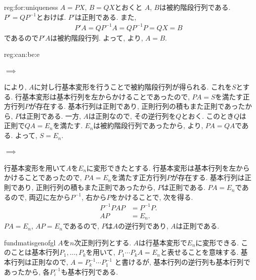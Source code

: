 \begin{proofof}{reg:for:uniqueness}
  $A=PX$, $B=QX$とおくと
  $A$, $B$は被約階段行列である.
  $P'=QP^{-1}$とおけば.
  $P'$は正則である.
  また,
  \begin{align*}
    P'A=QP^{-1}A=QP^{-1}P=QX=B
  \end{align*}
  であるので$P'A$は被約階段行列.
  よって,
  より,
  $A=B$.
\end{proofof}
\begin{proofof}{reg:can:be:e}
\paragraph{$\implies$}
により,
$A$に対し行基本変形を行うことで被約階段行列が得られる.
これを$S$とする.
行基本変形は基本行列を左からかけることであったので,
$PA=S$を満たす正方行列$P$が存在する.
基本行列は正則であり, 正則行列の積もまた正則であったから,
$P$は正則である.
一方,
$A$は正則なので,
その逆行列を$Q$とおく.
このとき$Q$は正則で$QA=E_n$を満たす.
$E_n$は被約階段行列であったから,
より,
$PA=QA$である.
よって,
$S=E_n$.

\paragraph{$\implies$}
行基本変形を用いて$A$を$E_n$に変形できたとする.
行基本変形は基本行列を左からかけることであったので,
$PA=E_n$を満たす正方行列$P$が存在する.
基本行列は正則であり, 正則行列の積もまた正則であったから,
$P$は正則である.
$PA=E_n$であるので,
両辺に左から$P^{-1}$, 右から$P$をかけることで,
次を得る.
\begin{align*}
  P^{-1}PAP&=P^{-1}P.\\
  AP&=E_n.
\end{align*}
$PA=E_n$, $AP=E_n$であるので,
$P$は$A$の逆行列であり,
$A$は正則である.
\end{proofof}


\begin{proofof}{fundmatisgenofgl}
  $A$を$n$次正則行列とする.
  $A$は行基本変形で$E_n$に変形できる.
  このことは基本行列$P_1,\ldots,P_k$を用いて,
  $P_1\cdots P_k A=E_n$と表せることを意味する.
  基本行列は正則なので,
  $A=P_k^{-1}\cdots P_1^{-1}$
  と書けるが, 基本行列の逆行列も基本行列であったから,
  各$P_i^{-1}$も基本行列である.
\end{proofof}

